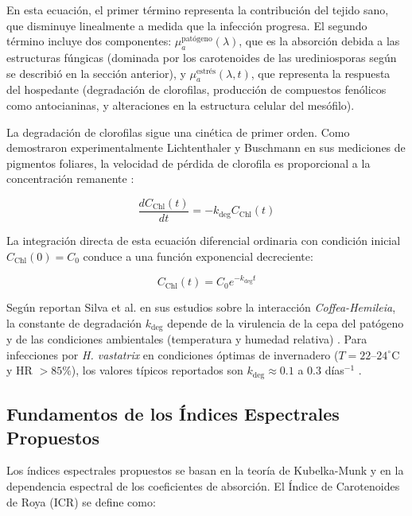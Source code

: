 \documentclass[12pt, a4paper]{article}
\begin{document}
	En esta ecuación, el primer término representa la contribución del tejido sano, que disminuye linealmente a medida que la infección progresa. El segundo término incluye dos componentes: $\mu_a^{\text{patógeno}}(\lambda)$, que es la absorción debida a las estructuras fúngicas (dominada por los carotenoides de las urediniosporas según se describió en la sección anterior), y $\mu_a^{\text{estrés}}(\lambda, t)$, que representa la respuesta del hospedante (degradación de clorofilas, producción de compuestos fenólicos como antocianinas, y alteraciones en la estructura celular del mesófilo).
	
	La degradación de clorofilas sigue una cinética de primer orden. Como demostraron experimentalmente Lichtenthaler y Buschmann en sus mediciones de pigmentos foliares, la velocidad de pérdida de clorofila es proporcional a la concentración remanente \parencite{lichtenthaler2001}:
	
	\begin{equation}
		\frac{dC_{\text{Chl}}(t)}{dt} = -k_{\text{deg}} C_{\text{Chl}}(t)
		\label{eq:cinetica_degradacion}
	\end{equation}
	
	La integración directa de esta ecuación diferencial ordinaria con condición inicial $C_{\text{Chl}}(0) = C_0$ conduce a una función exponencial decreciente:
	
	\begin{equation}
		C_{\text{Chl}}(t) = C_0 e^{-k_{\text{deg}} t}
		\label{eq:clorofila_temporal}
	\end{equation}
	
	Según reportan Silva et al. en sus estudios sobre la interacción \textit{Coffea-Hemileia}, la constante de degradación $k_{\text{deg}}$ depende de la virulencia de la cepa del patógeno y de las condiciones ambientales (temperatura y humedad relativa) \parencite{Silva2006}. Para infecciones por \textit{H. vastatrix} en condiciones óptimas de invernadero ($T = 22$--$24^\circ$C y HR $> 85\%$), los valores típicos reportados son $k_{\text{deg}} \approx 0.1$ a $0.3$ días$^{-1}$ \parencite{Talhinhas2017}.
	
	\subsection{Fundamentos de los Índices Espectrales Propuestos}
	
	Los índices espectrales propuestos se basan en la teoría de Kubelka-Munk y en la dependencia espectral de los coeficientes de absorción. El Índice de Carotenoides de Roya (ICR) se define como:
	
\end{document}
